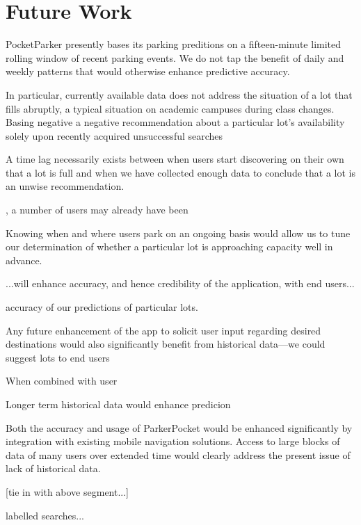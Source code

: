 \section{Future Work}
\label{sec-future}



PocketParker presently bases its parking preditions on a fifteen-minute 
limited rolling window of recent parking events. We do not tap the benefit
of daily and weekly patterns that would otherwise enhance predictive accuracy.

In particular, currently available data does not address the situation of a
lot that fills abruptly, a typical situation on academic campuses during
class changes. Basing negative a negative recommendation about a particular
lot's availability solely upon recently acquired unsuccessful searches

A time lag necessarily exists between when users start
discovering on their own that a lot is full and when we have collected enough
data to conclude that a lot is an unwise recommendation.

, a number of users may already have been 

Knowing when and where users park on an ongoing basis would allow us to tune
our determination of whether a particular lot is approaching capacity well
in advance.  


...will enhance accuracy, and hence credibility of the application, with end users...

accuracy of our predictions of particular lots.

Any future enhancement of the app to solicit user input regarding desired
destinations would also significantly benefit from historical data---we
could suggest lots to end users 

When combined with user

Longer term historical data
would enhance predicion




Both the accuracy and usage of ParkerPocket would be enhanced significantly
by integration with existing mobile navigation solutions.  Access to large blocks of data of many users over extended time
would clearly address the present issue of lack of historical data.

[tie in with above segment...]

labelled searches...







